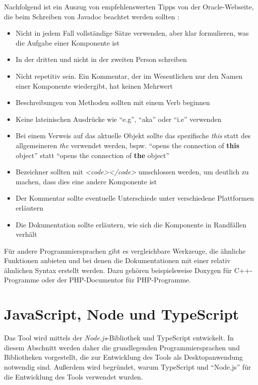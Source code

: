 Nachfolgend ist ein Auszug von empfehlenswerten Tipps von der Oracle-Webseite, die beim Schreiben von Javadoc beachtet werden sollten \cite{HowtoWriteDocCommentsfortheJavadocTool}:
\begin{itemize}
    \item Nicht in jedem Fall vollständige Sätze verwenden, aber klar formulieren, was die Aufgabe einer Komponente ist
    \item In der dritten und nicht in der zweiten Person schreiben
    \item Nicht repetitiv sein. Ein Kommentar, der im Wesentlichen nur den Namen einer Komponente wiedergibt, hat keinen Mehrwert
    \item  Beschreibungen von Methoden sollten mit einem Verb beginnen
    \item Keine lateinischen Ausdrücke wie \enquote{e.g}, \enquote{aka} oder \enquote{i.e} verwenden
    \item Bei einem Verweis auf das aktuelle Objekt sollte das spezifische \textit{this} statt des allgemeineren \textit{the} verwendet werden, bspw. \enquote{opens the connection of \textbf{this} object} statt \enquote{opens the connection of \textbf{the} object}
    \item Bezeichner sollten mit \textit{<code></code>} umschlossen werden, um deutlich zu machen, dass dies eine andere Komponente ist
    \item Der Kommentar sollte eventuelle Unterschiede unter verschiedene Plattformen erläutern
    \item Die Dokumentation sollte erläutern, wie sich die Komponente in Randfällen verhält
    
\end{itemize}

Für andere Programmiersprachen gibt es vergleichbare Werkzeuge, die ähnliche Funktionen anbieten und bei denen die Dokumentationen mit einer relativ ähnlichen Syntax erstellt werden. Dazu gehören beispielsweise Doxygen für C++-Programme oder der PHP-Documentor für PHP-Programme. 


\section{JavaScript, Node und TypeScript}
Das Tool wird mittels der \textit{Node.js}-Bibliothek und TypeScript entwickelt.
In diesem Abschnitt werden daher die grundlegenden Programmiersprachen und Bibliotheken vorgestellt, die zur Entwicklung des Tools als Desktopanwendung notwendig sind. Außerdem wird begründet, warum TypeScript und \enquote{Node.js} für die Entwicklung des Tools verwendet wurden. 
